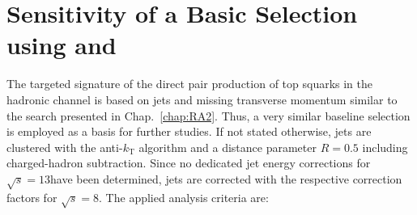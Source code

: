 \section{Sensitivity of a Basic Selection using \HT and \met}
\label{sec:stop_baseline}
The targeted signature of the direct pair production of top squarks in the hadronic channel is based on jets and missing transverse momentum similar to the search presented in Chap.~\ref{chap:RA2}. Thus, a very similar baseline selection is employed as a basis for further studies. If not stated otherwise, jets are clustered with the anti-$k_\mathrm{T}$ algorithm and a distance parameter $R = 0.5$ including charged-hadron subtraction. Since no dedicated jet energy corrections for $\sqrt{s} = 13$\tev have been determined, jets are corrected with the respective correction factors for $\sqrt{s} = 8$\tev. The applied analysis criteria are:
